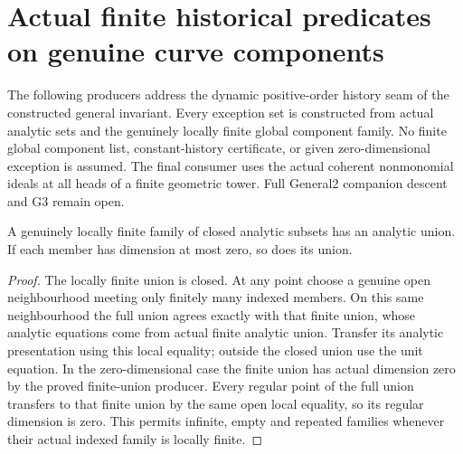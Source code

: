 \section{Actual finite historical predicates on genuine curve components}

The following producers address the dynamic positive-order history seam
of the constructed general invariant. Every exception set is constructed
from actual analytic sets and the genuinely locally finite global
component family. No finite global component list, constant-history
certificate, or given zero-dimensional exception is assumed. The final
consumer uses the actual coherent nonmonomial ideals at all heads of a
finite geometric tower. Full General2 companion descent and G3 remain open.

\begin{lemma}
\label{hir:curve-predicates-locally-finite-union}
\leanok
A genuinely locally finite family of closed analytic subsets has an
analytic union. If each member has dimension at most zero, so does its union.
\end{lemma}
\begin{proof}
The locally finite union is closed. At any point choose a genuine open
neighbourhood meeting only finitely many indexed members. On this same
neighbourhood the full union agrees exactly with that finite union, whose
analytic equations come from actual finite analytic union. Transfer its
analytic presentation using this local equality; outside the closed union
use the unit equation. In the zero-dimensional case the finite union has
actual dimension zero by the proved finite-union producer. Every regular
point of the full union transfers to that finite union by the same open
local equality, so its regular dimension is zero. This permits infinite,
empty and repeated families whenever their actual indexed family is locally finite.
\end{proof}

